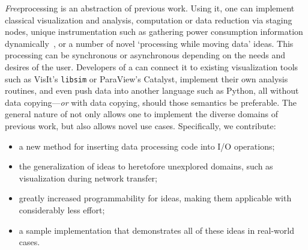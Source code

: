 \textit{Free}processing is an abstraction of previous work.  Using
it, one can implement classical \insitu{} visualization and analysis,
computation or data reduction via staging nodes, unique instrumentation
such as gathering power consumption information
dynamically~\cite{Gamell:2013:InSituPower}, or a number of novel
`processing while moving data' ideas.  This processing can be
synchronous or asynchronous depending on the needs and desires of the
user.  Developers of a \freeprocessor{} can connect it to existing
visualization tools such as VisIt's \texttt{libsim} or ParaView's
Catalyst, implement their own analysis routines, and even push data
into another language such as Python, all without data
copying---\emph{or} with data copying, should those semantics be
preferable.  The general
nature of \freeprocessing{} not only allows one to implement the
diverse domains of previous work, but also allows novel use cases.
Specifically, we contribute:


\begin{itemize}

  \item a new method for inserting data processing code into I/O
  operations;

  \item the generalization of \insitu{} ideas to heretofore unexplored
  domains, such as visualization during network transfer;

  \item greatly increased programmability for \insitu{} ideas, making
  them applicable with considerably less effort;

  \item a sample implementation that demonstrates all of these ideas in
  real-world cases.

\end{itemize}

